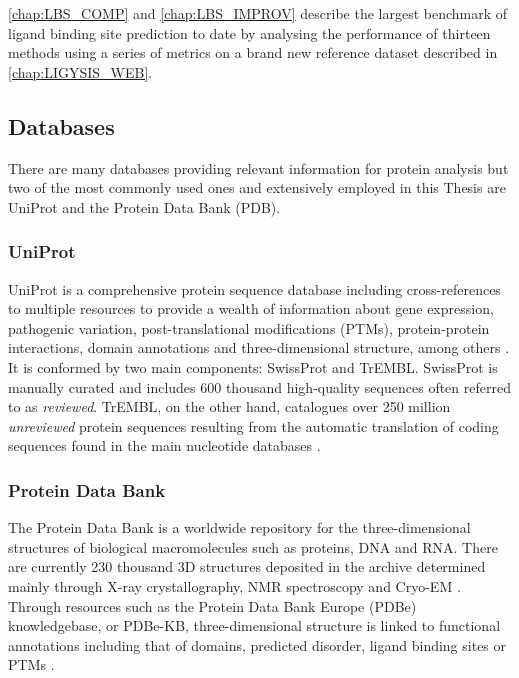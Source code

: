 \autoref{chap:LBS_COMP} and \autoref{chap:LBS_IMPROV} describe the largest benchmark of ligand binding site prediction to date by analysing the performance of thirteen methods using a series of metrics on a brand new reference dataset described in \autoref{chap:LIGYSIS_WEB}.

\subsection{Databases}

There are many databases providing relevant information for protein analysis but two of the most commonly used ones and extensively employed in this Thesis are UniProt and the Protein Data Bank (PDB).

\subsubsection{UniProt}

UniProt is a comprehensive protein sequence database including cross-references to multiple resources to provide a wealth of information about gene expression, pathogenic variation, post-translational modifications (PTMs), protein-protein interactions, domain annotations and three-dimensional structure, among others \cite{BAIROCH_2005_UNIPROT}. It is conformed by two main components: SwissProt and TrEMBL. SwissProt is manually curated and includes 600 thousand high-quality sequences often referred to as \textit{reviewed}. TrEMBL, on the other hand, catalogues over 250 million \textit{unreviewed} protein sequences resulting from the automatic translation of coding sequences found in the main nucleotide databases \cite{BAIROCH_2000_UNIPROT}.

\subsubsection{Protein Data Bank}

The Protein Data Bank is a worldwide repository for the three-dimensional structures of biological macromolecules such as proteins, DNA and RNA. There are currently 230 thousand 3D structures deposited in the archive determined mainly through X-ray crystallography, NMR spectroscopy and Cryo-EM \cite{BERMAN_2003_PDB}. Through resources such as the Protein Data Bank Europe (PDBe) knowledgebase, or PDBe-KB, three-dimensional structure is linked to functional annotations including that of domains, predicted disorder, ligand binding sites or PTMs \cite{PDBEKB_2019_PDBEKB}.

